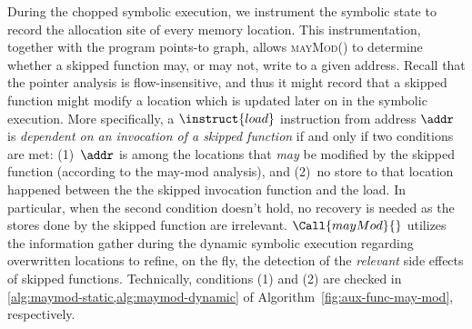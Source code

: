 During the chopped symbolic execution, we instrument the symbolic state to record the allocation site of every 
memory location. 
This instrumentation, together with the program points-to graph, allows \textsc{mayMod}()
to determine whether a skipped function may, or may not, write to a given address.
Recall that the pointer analysis is flow-insensitive, and thus 
it might record that a skipped function might modify a location which is updated later on in the symbolic execution.
More specifically, a $\instruct{load}$ instruction from address $\addr$ is \emph{dependent on an invocation of a skipped function} if and only if two conditions are met: 
(1)~$\addr$ is among the 
locations that \textit{may} be modified by the skipped function (according to the may-mod analysis),
and (2)~no store to that location happened between the the skipped invocation function and the load.
In particular, when the second condition doesn't hold, no recovery is needed
as the stores done by the skipped function are irrelevant. 
$\Call{mayMod}{}$ utilizes the information gather during the dynamic symbolic execution 
regarding overwritten locations to 
refine, on the fly, the detection of the \emph{relevant} side effects of skipped functions. 
Technically, conditions (1) and (2) are checked in \cref{alg:maymod-static,alg:maymod-dynamic}
of Algorithm~\ref{fig:aux-func-may-mod},
respectively.






